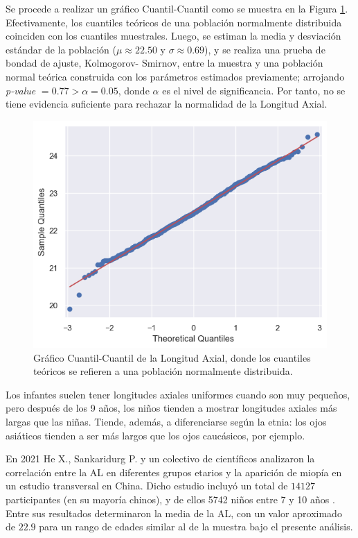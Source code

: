\documentclass[a4paper,10pt,twocolumn]{article}
\begin{document}
	Se procede a realizar un gráfico Cuantil-Cuantil como se muestra en la Figura \ref{fig:2}. Efectivamente, los cuantiles teóricos de una población normalmente distribuida coinciden con los cuantiles muestrales. Luego, se estiman la media y desviación estándar de la población ($\mu \approx 22.50$ y $\sigma \approx 0.69$), y se realiza una prueba de bondad de ajuste, Kolmogorov- Smirnov, entre la muestra y una población normal teórica construida con los parámetros estimados previamente; arrojando \emph{p-value} $ = 0.77 > \alpha = 0.05$, donde $\alpha$ es el nivel de significancia. Por tanto, no se tiene evidencia suficiente para rechazar  la normalidad de la Longitud Axial.
	\\
	
		\begin{figure}[htb]%
		\begin{center}
			\centering
			\includegraphics[height = .75\linewidth, width=.75\linewidth]{assets/AL_qqplot}
		\end{center}
		\caption{Gráfico Cuantil-Cuantil de la Longitud Axial, donde los cuantiles teóricos se refieren a una población normalmente distribuida.}
		\label{fig:2}
	\end{figure}
	
	 Los infantes suelen tener longitudes axiales uniformes cuando son muy pequeños, pero después de los 9 años, los niños tienden a mostrar longitudes axiales más largas que las niñas. Tiende, además, a diferenciarse según la etnia: los ojos asiáticos tienden a ser más largos que los ojos caucásicos, por ejemplo.
	 
	 En 2021 He X., Sankaridurg P. y un colectivo de científicos analizaron la correlación entre la AL en diferentes grupos etarios y la aparición de miopía en un estudio transversal en China. Dicho estudio incluyó un total de $14127$ participantes (en su mayoría chinos), y de ellos 5742 niños entre 7 y 10 años \cite{hex}. Entre sus resultados determinaron la media de la AL, con un valor aproximado de $22.9$ para un rango de edades similar al de la muestra bajo el presente análisis.
	 
\end{document}
